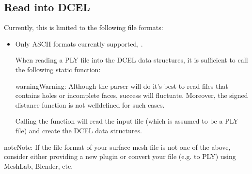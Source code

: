 \documentclass[letterpaper,10pt,english]{sphinxmanual}
\begin{document}
\subsection{Read into DCEL}
\label{\detokenize{Parsers:read-into-dcel}}
\sphinxAtStartPar
Currently, this is limited to the following file formats:
\begin{itemize}
\item {} 
\sphinxAtStartPar
{} Only ASCII formats currently supported, .

\sphinxAtStartPar
When reading a PLY file into the DCEL data structures, it is sufficient to call the following static function:

\begin{sphinxVerbatim}[commandchars=\\\{\}]
 
   

 
   
\end{sphinxVerbatim}

\begin{sphinxadmonition}{warning}{Warning:}
\sphinxAtStartPar
Although the parser will do it’s best to read files that contains holes or incomplete faces, success will fluctuate.
Moreover, the signed distance function is not well\sphinxhyphen{}defined for such cases.
\end{sphinxadmonition}

\sphinxAtStartPar
Calling the  function will read the input file (which is assumed to be a PLY file) and create the DCEL data structures.

\end{itemize}

\begin{sphinxadmonition}{note}{Note:}
\sphinxAtStartPar
If the file format of your surface mesh file is not one of the above, consider either providing a new plugin or convert your file (e.g. to PLY) using MeshLab, Blender, etc.
\end{sphinxadmonition}
\end{document}
